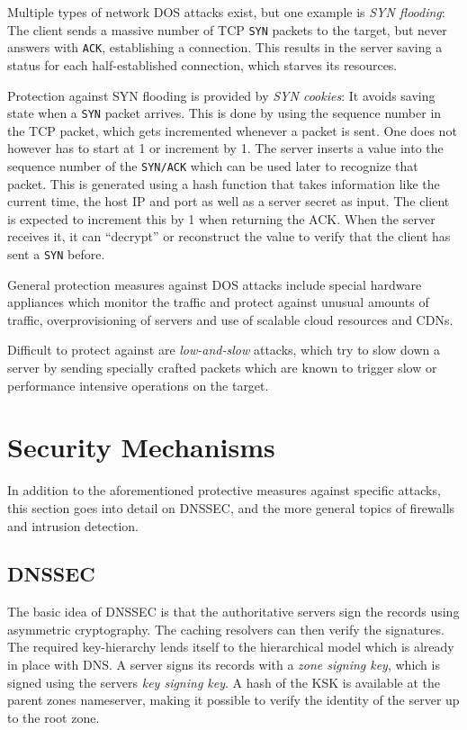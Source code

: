 Multiple types of network DOS attacks exist, but one example is \emph{SYN
flooding}: The client sends a massive number of TCP \texttt{SYN} packets to the
target, but never answers with \texttt{ACK}, establishing a connection. This
results in the server saving a status for each half-established connection,
which starves its resources.

Protection against SYN flooding is provided by \emph{SYN cookies}: It avoids
saving state when a \texttt{SYN} packet arrives. This is done by using the
sequence number in the TCP packet, which gets incremented whenever a packet is
sent. One does not however has to start at 1 or increment by 1. The server
inserts a value into the sequence number of the \texttt{SYN/ACK} which can be
used later to recognize that packet. This is generated using a hash function
that takes information like the current time, the host IP and port as well as a
server secret as input. The client is expected to increment this by 1 when
returning the ACK. When the server receives it, it can ``decrypt'' or
reconstruct the value to verify that the client has sent a \texttt{SYN} before.

General protection measures against DOS attacks include special hardware
appliances which monitor the traffic and protect against unusual amounts of
traffic, overprovisioning of servers and use of scalable cloud resources and
CDNs.

Difficult to protect against are \emph{low-and-slow} attacks, which try to slow
down a server by sending specially crafted packets which are known to trigger
slow or performance intensive operations on the target.

\section{Security Mechanisms}

In addition to the aforementioned protective measures against specific attacks,
this section goes into detail on DNSSEC, and the more general topics of
firewalls and intrusion detection.

\subsection{DNSSEC}
\label{sec:dnssec}
The basic idea of DNSSEC is that the authoritative servers sign the records
using asymmetric cryptography. The caching resolvers can then verify the
signatures. The required key-hierarchy lends itself to the hierarchical model
which is already in place with DNS. A server signs its records with a \emph{zone
signing key}, which is signed using the servers \emph{key signing key}. A hash
of the KSK is available at the parent zones nameserver, making it possible to
verify the identity of the server up to the root zone.

